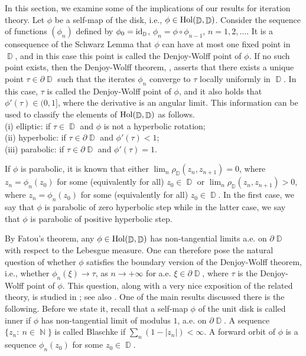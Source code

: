 \documentclass[11pt, letterpaper,leqno]{amsart}
\numberwithin{equation}{section}
\theoremstyle{definition}
\DeclareMathOperator{\D}{\mathbb{D}}
\DeclareMathOperator{\N}{\mathbb{N}}
\begin{document}
In this section, we examine some of the implications of our results for iteration theory. Let $\phi$ be a self-map of the disk, i.e., $\phi\in \rm{Hol}(\D, \D)$.
Consider the sequence of functions $(\phi_n)$ defined by $\phi_0={\rm id}_{\D}$, $\phi_n=\phi\circ \phi_{n-1}$, $n=1,2,\dots$. It is 
 a consequence of the Schwarz Lemma that $\phi$ can have at most one fixed point in $\D$, and in this case this point is called the Denjoy-Wolff point of $\phi$. If no such point exists, then the Denjoy-Wolff theorem, \cite[Theorem 3.2.1]{Abate}, asserts that there exists a unique point $\tau\in\partial\D$ such that the iterates $\phi_n$ converge to $\tau$ locally uniformly in $\D$. In this case, $\tau$ is called the Denjoy-Wolff point of $\phi$, and it also holds that $\phi'(\tau)\in (0,1]$, where the derivative is an angular limit. This information can be used to classify the elements of $\rm{Hol}(\D, \D)$ as follows.\\
(i) elliptic: if $\tau\in\D$ and $\phi$ is not a hyperbolic rotation;\\
(ii) hyperbolic: if $\tau\in\partial\D$ and $\phi'(\tau)<1$;\\
(iii) parabolic: if $\tau\in\partial\D$ and $\phi'(\tau)=1$.

If $\phi$ is parabolic, it is known that either $\lim_{n} \rho_{\D} (z_n,z_{n+1})=0$, where $z_n=\phi_n(z_0)$ for some (equivalently for all) $z_0\in\D$ or $\lim_{n} \rho_{\D} (z_n,z_{n+1})>0$, where $z_n=\phi_n(z_0)$ for some (equivalently for all) $z_0\in\D$. In the first case, we say that $\phi$ is parabolic of zero hyperbolic step while in the latter case, we say that $\phi$ is parabolic of positive hyperbolic step. 

By Fatou's theorem, any $\phi\in\rm{Hol}(\D, \D)$ has non-tangential limits a.e. on $\partial\D$ with respect to the Lebesgue measure. One can therefore pose the natural question of whether $\phi$ satisfies the boundary version of the Denjoy-Wolff theorem, i.e., whether $\phi_n(\xi)\to \tau$, as $n\to +\infty$ for a.e. $\xi\in\partial\D$, where $\tau$ is the Denjoy-Wolff point of $\phi$. This question, along with a very nice exposition of the related theory, is studied in \cite{CDP}; see also \cite{BCD}. One of the main results discussed there is the following. Before we state it, recall that a self-map $\phi$ of the unit disk is called inner if $\phi$ has non-tangential limit of modulus $1$, a.e. on $\partial\D$. A sequence $\{z_n:\ n\in\N\}$ is called Blaschke if $\sum_n\left(1-|z_n|\right)<\infty$. A forward orbit of $\phi$ is a sequence $\phi_n(z_0)$ for some $z_0\in\D$.\\
\end{document}
